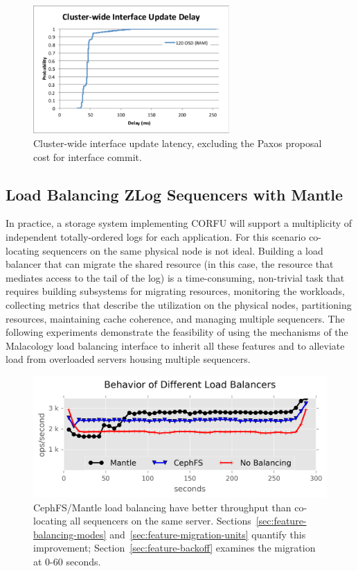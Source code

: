 \documentclass[preprint]{sigplanconf-eurosys}
\begin{document}
\begin{figure}[h]
\centering
\includegraphics[width=75mm,trim={1 4 4 1.3cm},clip]{figures/iface-update-delay.pdf}
\caption{Cluster-wide interface update latency, excluding the Paxos proposal cost for
interface commit.}
\label{fig:propdelay}
\end{figure}

\subsection{Load Balancing ZLog Sequencers with Mantle}
\label{sec:zlog-balancing}

In practice, a storage system implementing CORFU will support a multiplicity of
independent totally-ordered logs for each application.  For this scenario
co-locating sequencers on the same physical node is not ideal. Building a load
balancer that can migrate the shared resource (in this case, the resource that
mediates access to the tail of the log) is a time-consuming, non-trivial task
that requires building subsystems for migrating resources, monitoring the
workloads, collecting metrics that describe the utilization on the physical
nodes, partitioning resources, maintaining cache coherence, and managing
multiple sequencers. The following experiments demonstrate the feasibility of
using the mechanisms of the Malacology load balancing interface to inherit all
these features and to alleviate load from overloaded servers housing multiple
sequencers.

\begin{figure}[t!]
\centering
\includegraphics{figures/mantle-balancer-behaviors.png}
\caption{CephFS/Mantle load balancing have better throughput than co-locating
all sequencers on the same server.  Sections~\ref{sec:feature-balancing-modes}
and~\ref{sec:feature-migration-units} quantify this improvement;
Section~\ref{sec:feature-backoff} examines the migration at 0-60 seconds.
}\label{fig:mantle-balancer-behaviors}
\end{figure}
\end{document}
